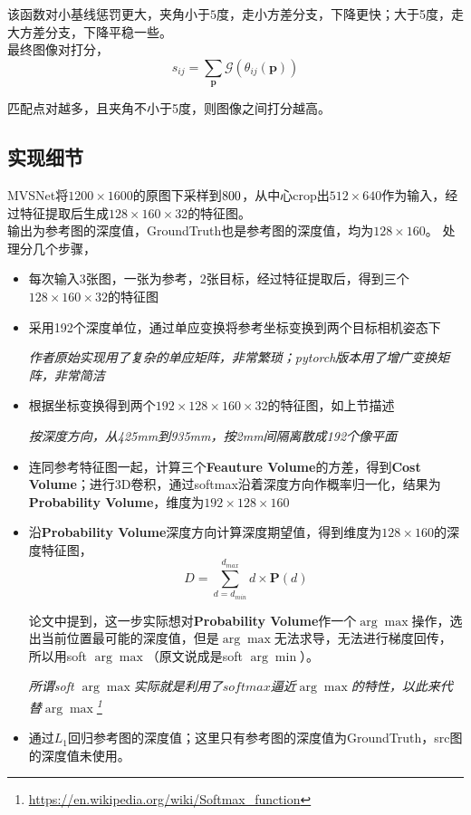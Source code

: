 	该函数对小基线惩罚更大，夹角小于$5$度，走小方差分支，下降更快；大于5度，走大方差分支，下降平稳一些。\\

	最终图像对打分，
	$$
		s_{ij} = \sum_{\mathbf{p}}\mathcal{G}\left(\theta_{ij}(\mathbf{p})\right)
	$$

	匹配点对越多，且夹角不小于5度，则图像之间打分越高。

\subsection{实现细节}
	MVSNet将$1200 \times 1600$的原图下采样到$800 \time 600$，从中心crop出$512 \times 640$作为输入，经过特征提取后生成$128 \times 160 \times 32$的特征图。\\

	输出为参考图的深度值，GroundTruth也是参考图的深度值，均为$128 \times 160$。 处理分几个步骤，

	\begin{itemize}
		\item 每次输入3张图，一张为参考，2张目标，经过特征提取后，得到三个$128 \times 160 \times 32$的特征图
		
		\item 采用192个深度单位，通过单应变换将参考坐标变换到两个目标相机姿态下

			\textit{作者原始实现用了复杂的单应矩阵，非常繁琐；pytorch版本用了增广变换矩阵，非常简洁}

		\item 根据坐标变换得到两个$192 \times 128 \times 160 \times 32$的特征图，如上节描述

			\textit{按深度方向，从425mm到935mm，按2mm间隔离散成192个像平面}

		\item 连同参考特征图一起，计算三个\textbf{Feauture Volume}的方差，得到\textbf{Cost Volume}；进行3D卷积，通过softmax沿着深度方向作概率归一化，结果为\textbf{Probability Volume}，维度为$192 \times 128 \times 160$

		\item 沿\textbf{Probability Volume}深度方向计算深度期望值，得到维度为$128 \times 160$的深度特征图，
			$$
				D = \sum_{d = d_{min}}^{d_{max}} d \times \mathbf{P}(d)
			$$

			论文中提到，这一步实际想对\textbf{Probability Volume}作一个$\arg\max$操作，选出当前位置最可能的深度值，但是$\arg\max$无法求导，无法进行梯度回传，所以用soft $\arg\max$（原文说成是soft $\arg\min$）。

			\textit{所谓soft $\arg\max$实际就是利用了$softmax$逼近$\arg\max$的特性，以此来代替$\arg\max$\footnote{\url{https://en.wikipedia.org/wiki/Softmax_function}}}

		\item 通过$L_1$回归参考图的深度值；这里只有参考图的深度值为GroundTruth，src图的深度值未使用。
	\end{itemize}

